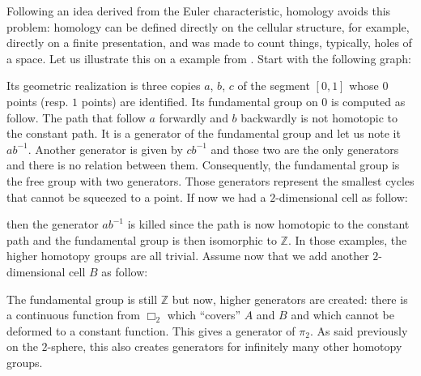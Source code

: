 Following an idea derived from the Euler characteristic, homology avoids this problem: homology can be defined directly on the cellular structure, for example, directly on a finite presentation, and was made to count things, typically, holes of a space. Let us illustrate this on a example from \cite{hatcher02}. Start with the following graph:
	\begin{figure}[H]
		\begin{center}
    			
  		\end{center}
	\end{figure}
\noindent Its geometric realization is three copies $a$, $b$, $c$ of the segment $[0,1]$ whose $0$ points (resp. $1$ points) are identified. Its fundamental group on $0$ is computed as follow. The path that follow $a$ forwardly and $b$ backwardly is not homotopic to the constant path. It is a generator of the fundamental group and let us note it $ab^{-1}$. Another generator is given by $cb^{-1}$ and those two are the only generators and there is no relation between them. Consequently, the fundamental group is the free group with two generators. Those generators represent the smallest cycles that cannot be squeezed to a point. If now we had a $2$-dimensional cell as follow:
	\begin{figure}[H]
		\begin{center}
    			
  		\end{center}
	\end{figure}
\noindent then the generator $ab^{-1}$ is killed since the path is now homotopic to the constant path and the fundamental group is then isomorphic to $\mathbb{Z}$. In those examples, the higher homotopy groups are all trivial. Assume now that we add another $2$-dimensional cell $B$ as follow:
	\begin{figure}[H]
		\begin{center}
    			
  		\end{center}
	\end{figure}
The fundamental group is still $\mathbb{Z}$ but now, higher generators are created: there is a continuous function from $\Box_2$ which ``covers'' $A$ and $B$ and which cannot be deformed to a constant function. This gives a generator of $\pi_2$. As said previously on the $2$-sphere, this also creates generators for infinitely many other homotopy groups.

